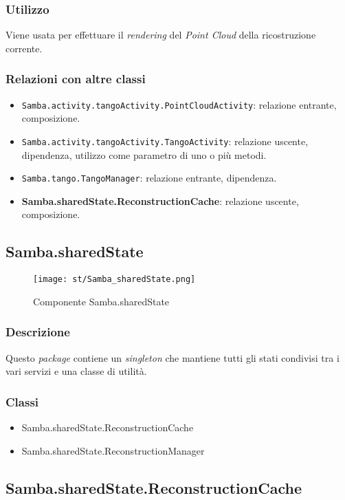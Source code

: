 \subsubsection{Utilizzo}
Viene usata per effettuare il \emph{rendering} del \emph{Point Cloud} della ricostruzione corrente.
\subsubsection{Relazioni con altre classi}
\begin{itemize}
	\item \texttt{Samba.activity.tangoActivity.PointCloudActivity}: relazione entrante, composizione.
	\item \texttt{Samba.activity.tangoActivity.TangoActivity}: relazione uscente, dipendenza, utilizzo come parametro di uno o più metodi.
	\item \texttt{Samba.tango.TangoManager}: relazione entrante, dipendenza.
	\item \textbf{Samba.sharedState.ReconstructionCache}: relazione uscente, composizione.
\end{itemize}


\subsection{Samba.sharedState}
\begin{figure}[!h] 
    \centering 
    \texttt{[image: st/Samba\_sharedState.png]} 
    \caption{Componente Samba.sharedState}
\end{figure}
\subsubsection{Descrizione}
Questo \emph{package} contiene un \emph{singleton} che mantiene tutti gli stati condivisi tra i vari servizi e una classe di utilità.
\subsubsection{Classi}
\begin{itemize}
	\item Samba.sharedState.ReconstructionCache
	\item Samba.sharedState.ReconstructionManager
\end{itemize}

\subsection{Samba.sharedState.ReconstructionCache}
